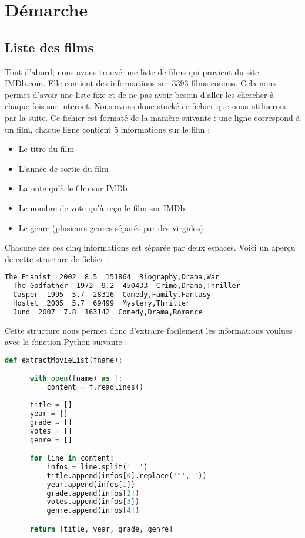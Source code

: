 \chapter{Démarche}
\section{Liste des films}

Tout d'abord, nous avons trouvé une liste de films qui provient du site \url{IMDb.com}. Elle contient des informations sur 3393 films connus. Cela nous permet d'avoir une liste fixe et de ne pas avoir besoin d'aller les chercher à chaque fois sur internet. Nous avons donc stocké ce fichier que nous utiliserons par la suite. Ce fichier est formaté de la manière suivante : une ligne correspond à un film, chaque ligne contient 5 informations sur le film : \\

\begin{itemize}
 \item Le titre du film
 \item L'année de sortie du film
 \item La note qu'à le film sur IMDb
 \item Le nombre de vote qu'à reçu le film sur IMDb
 \item Le genre (plusieurs genres séparés par des virgules)
\end{itemize}

\vspace{0.4cm}
Chacune des ces cinq informations est séparée par deux espaces. Voici un aperçu de cette structure de fichier : \\

\begin{lstlisting}[language=bash]
  The Pianist﻿  2002﻿  8.5﻿  151864﻿  Biography,Drama,War
  The Godfather﻿  1972﻿  9.2﻿  450433﻿  Crime,Drama,Thriller
  Casper﻿  1995﻿  5.7﻿  28316﻿  Comedy,Family,Fantasy
  Hostel﻿  2005﻿  5.7﻿  69499﻿  Mystery,Thriller
  Juno﻿  2007﻿  7.8﻿  163142﻿  Comedy,Drama,Romance
\end{lstlisting}

Cette structure nous permet donc d'extraire facilement les informations voulues avec la fonction Python suivante : \\

\begin{lstlisting}[language=python]
  def extractMovieList(fname):

      with open(fname) as f:
          content = f.readlines()
    
      title = []
      year = []
      grade = []
      votes = []
      genre = []

      for line in content:
          infos = line.split('  ')
          title.append(infos[0].replace('"',''))
          year.append(infos[1])
          grade.append(infos[2])
          votes.append(infos[3])
          genre.append(infos[4])

      return [title, year, grade, genre]
\end{lstlisting}

